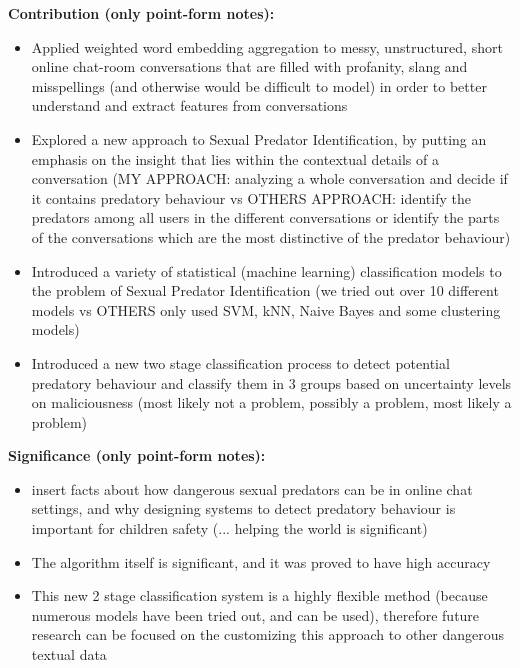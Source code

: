 \documentclass[11pt]{article}
\begin{document}
\textbf{Contribution (only point-form notes):}
\begin{itemize}
    \item Applied weighted word embedding aggregation to messy, unstructured, short online chat-room conversations that are filled with profanity, slang and misspellings (and otherwise would be difficult to model) in order to better understand and extract features from conversations
    \item Explored a new approach to Sexual Predator Identification, by putting an emphasis on the insight that lies within the contextual details of a conversation (MY APPROACH: analyzing a whole conversation and decide if it contains predatory behaviour vs OTHERS APPROACH: identify the predators among all users in the different conversations or identify the parts of the conversations which are the most distinctive of the predator behaviour)
    \item Introduced a variety of statistical (machine learning) classification models to the problem of Sexual Predator Identification (we tried out over 10 different models vs OTHERS only used SVM, kNN, Naive Bayes and some clustering models)
    \item Introduced a new two stage classification process to detect potential predatory behaviour and classify them in 3 groups based on uncertainty levels on maliciousness (most likely not a problem, possibly a problem, most likely a problem)
\end{itemize}

\textbf{Significance (only point-form notes):}
\begin{itemize}
    \item insert facts about how dangerous sexual predators can be in online chat settings, and why designing systems to detect predatory behaviour is important for children safety (... helping the world is significant)
    \item The algorithm itself is significant, and it was proved to have high accuracy
    \item This new 2 stage classification system is a highly flexible method (because numerous models have been tried out, and can be used), therefore future research can be focused on the customizing this approach to other dangerous textual data
\end{itemize}
\end{document}
